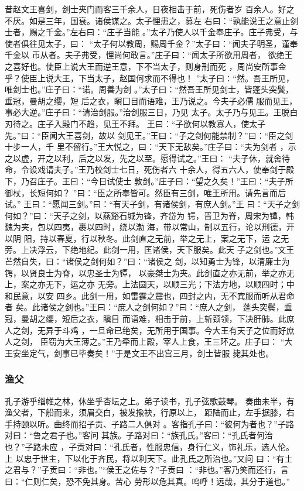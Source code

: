 \documentclass[]{article}
\begin{document}
昔赵文王喜剑，剑士夹门而客三千余人，日夜相击于前，死伤者岁
百余人。好之不厌。如是三年，国衰。诸侯谋之。太子悝患之，募左
右曰：``孰能说王之意止剑士者，赐之千金。''左右曰：``庄子当能
。''太子乃使人以千金奉庄子。庄子弗受，与使者俱往见太子，曰：
``太子何以教周，赐周千金？''太子曰：``闻夫子明圣，谨奉千金以
币从者。夫子弗受，悝尚何敢言。''庄子曰：``闻太子所欲用周者，
欲绝王之喜好也。使臣上说大王而逆王意，下不当太子，则身刑而死
，周尚安所事金乎？使臣上说大王，下当太子，赵国何求而不得也！
''太子曰∶``然。吾王所见，唯剑士也。''庄子曰：``诺。周善为剑
。''太子曰：``然吾王所见剑士，皆蓬头突鬓，垂冠，曼胡之缨，短
后之衣，瞋囗目而语难，王乃说之。今夫子必儒
服而见王，事必大逆。''庄子曰：``请治剑服。''治剑服三日，乃见
太子。太子乃与见王。王脱白刃待之。庄子入殿门不趋，见王不拜。
王曰：``子欲何以教寡人，使太子先。''曰：``臣闻大王喜剑，故以
剑见王。''王曰：``子之剑何能禁制？''曰：``臣之剑十步一人，千
里不留行。''王大悦之，曰：``天下无敌矣。''庄子曰：``夫为剑者
，示之以虚，开之以利，后之以发，先之以至。愿得试之。''王曰：
``夫子休，就舍待命，令设戏请夫子。''王乃校剑士七日，死伤者六
十余人，得五六人，使奉剑于殿下，乃召庄子。王曰：``今日试使士
敦剑。''庄子曰：``望之久矣！''王曰：``夫子所御杖，长短何如？
''曰：``臣之所奉皆可。然臣有三剑，唯王所用。请先言而后试。''
王曰：``愿闻三剑。''曰：``有天子剑，有诸侯剑，有庶人剑。''王
曰：``天子之剑何如？''曰：``天子之剑，以燕谿石城为锋，齐岱为
锷，晋卫为脊，周宋为镡，韩魏为夹，包以四夷，裹以四时，绕以渤
海，带以常山，制以五行，论以刑德，开以阴
阳，持以春夏，行以秋冬。此剑直之无前，举之无上，案之无下，运
之无旁。上决浮云，下绝地纪。此剑一用，匡诸侯，天下服矣。此天
子之剑也。''文王芒然自失，曰：``诸侯之剑何如？''曰：``诸侯之
剑，以知勇士为锋，以清廉士为锷，以贤良士为脊，以忠圣士为镡，
以豪桀士为夹。此剑直之亦无前，举之亦无上，案之亦无下，运之亦
无旁。上法圆天，以顺三光；下法方地，以顺四时；中和民意，以安
四乡。此剑一用，如雷霆之震也，四封之内，无不宾服而听从君命者
矣。此诸侯之剑也。''王曰：``庶人之剑何如？''曰：``庶人之剑，
蓬头突鬓，垂冠，曼胡之缨，短后之衣，瞋目
而语难，相击于前，上斩颈领，下决肝肺。此庶人之剑，无异于斗鸡
，一旦命已绝矣，无所用于国事。今大王有天子之位而好庶人之剑，
臣窃为大王薄之。''王乃牵而上殿，宰人上食，王三环之。庄子曰：
``大王安坐定气，剑事已毕奏矣！''于是文王不出宫三月，剑士皆服 毙其处也。

\hypertarget{header-n2396}{%
\subsubsection{渔父}\label{header-n2396}}

孔子游乎缁帷之林，休坐乎杏坛之上。弟子读书，孔子弦歌鼓琴。
奏曲未半，有渔父者，下船而来，须眉交白，被发揄袂，行原以上，
距陆而止，左手据膝，右手持颐以听。曲终而招子贡、子路二人俱对
。客指孔子曰：``彼何为者也？''子路对曰：``鲁之君子也。''客问
其族。子路对曰：``族孔氏。''客曰：``孔氏者何治也？''子路未应
，子贡对曰：``孔氏者，性服忠信，身行仁义，饰礼乐，选人伦。上
以忠于世主，下以化于齐民，将以利天下。此孔氏之所治也。''又问
曰：``有土之君与？''子贡曰：``非也。''``侯王之佐与？''子贡曰
：``非也。''客乃笑而还行，言曰：``仁则仁矣，恐不免其身。苦心
劳形以危其真。呜呼！远哉，其分于道也。''
\end{document}
